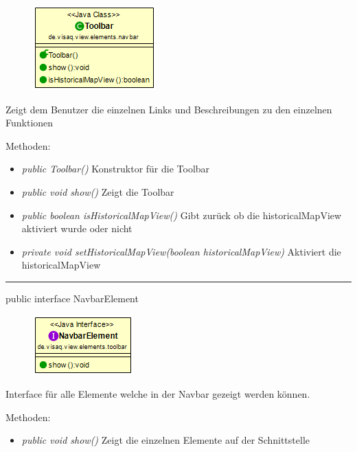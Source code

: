 \begin{minipage}{0.3\textwidth}
    \begin{figure}[H]
        \includegraphics[scale = 0.6]{media/frontend/view/de.view.elements.navbar/ToolbarClass.png}
    \end{figure}
    \end{minipage} \hfill
    \begin{minipage}{0.6\textwidth}
Zeigt dem Benutzer die einzelnen Links und Beschreibungen zu den einzelnen Funktionen
\end{minipage}

Methoden:
\begin{itemize} 
    \item \emph{public Toolbar()} Konstruktor für die Toolbar
    \item \emph{public void show()} Zeigt die Toolbar
    \item \emph{public boolean isHistoricalMapView()} Gibt zurück ob die historicalMapView aktiviert wurde oder nicht
    \item \emph{private void setHistoricalMapView(boolean historicalMapView)} Aktiviert die historicalMapView
\end{itemize}

\rule{\textwidth}{0.4pt} 
public interface NavbarElement 

\begin{minipage}{0.3\textwidth}
    \begin{figure}[H]
        \includegraphics[scale = 0.7]{media/frontend/view/de.view.elements.navbar/NavbarElementClass.png}
    \end{figure}
\end{minipage} \hfill
\begin{minipage}{0.6\textwidth}
Interface für alle Elemente welche in der Navbar gezeigt werden können. 
\end{minipage}

Methoden:
\begin{itemize} 
    \item \emph{public void show()} Zeigt die einzelnen Elemente auf der Schnittstelle
\end{itemize}
